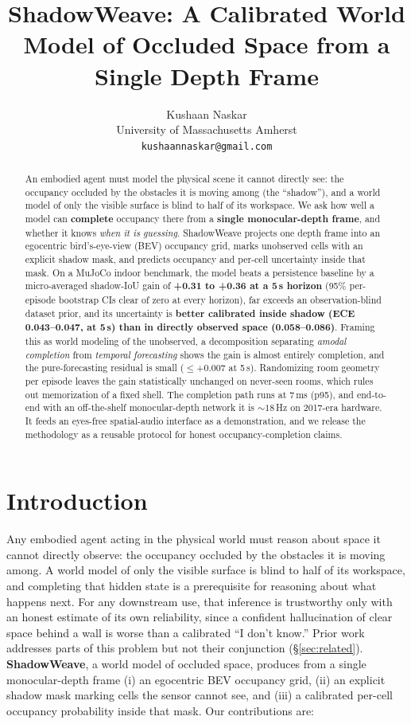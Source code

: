 \documentclass{article}
\title{ShadowWeave: A Calibrated World Model of Occluded Space from a Single Depth Frame}
\author{Kushaan Naskar\\
  University of Massachusetts Amherst\\
  \texttt{kushaannaskar@gmail.com}}
\begin{document}
\maketitle

\begin{abstract}
An embodied agent must model the physical scene it cannot directly see: the occupancy occluded
by the obstacles it is moving among (the ``shadow''), and a world model of only the visible surface
is blind to half of its workspace. We ask how well a model can \textbf{complete} occupancy there
from a \textbf{single monocular-depth frame}, and whether it knows \emph{when it is guessing}.
ShadowWeave projects one depth frame into an egocentric bird's-eye-view (BEV) occupancy grid,
marks unobserved cells with an explicit shadow mask, and predicts occupancy and per-cell
uncertainty inside that mask. On a MuJoCo indoor benchmark, the model beats a persistence
baseline by a micro-averaged shadow-IoU gain of \textbf{+0.31 to +0.36 at a 5\,s horizon} (95\%
per-episode bootstrap CIs clear of zero at every horizon), far exceeds an observation-blind
dataset prior, and its uncertainty is \textbf{better calibrated inside shadow (ECE
0.043--0.047, at 5\,s) than in directly observed space (0.058--0.086)}. Framing this as world
modeling of the unobserved, a decomposition separating \emph{amodal completion} from
\emph{temporal forecasting} shows the gain is almost entirely completion, and the pure-forecasting
residual is small ($\le$+0.007 at 5\,s). Randomizing room geometry per episode leaves the gain
statistically unchanged on never-seen rooms, which rules out memorization of a fixed shell. The
completion path runs at 7\,ms (p95), and end-to-end with an off-the-shelf monocular-depth network
it is ${\sim}18$\,Hz on 2017-era hardware. It feeds an eyes-free spatial-audio interface as a
demonstration, and we release the methodology as a reusable protocol for honest
occupancy-completion claims.
\end{abstract}

\section{Introduction}
\label{sec:intro}

Any embodied agent acting in the physical world must reason about space it cannot directly
observe: the occupancy occluded by the obstacles it is moving among. A world model of only the
visible surface is blind to half of its workspace, and completing that hidden state is a
prerequisite for reasoning about what happens next. For any downstream use, that inference is
trustworthy only with an honest estimate of its own reliability, since a confident hallucination of
clear space behind a wall is worse than a calibrated ``I don't know.'' Prior work addresses parts
of this problem but not their conjunction (\S\ref{sec:related}).
\textbf{ShadowWeave}, a world model of occluded space, produces from a single monocular-depth
frame (i) an egocentric BEV occupancy grid, (ii) an explicit shadow mask marking cells the sensor
cannot see, and (iii) a calibrated per-cell occupancy probability inside that mask. Our
contributions are:
\end{document}
